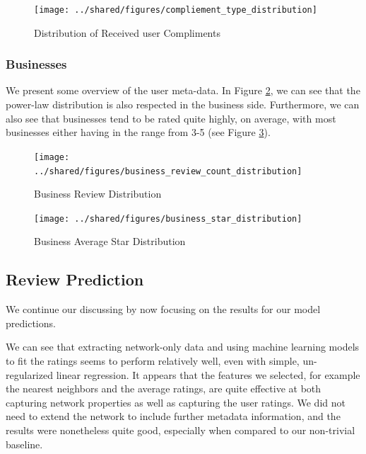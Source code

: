 \documentclass[letterpaper, 10 pt, conference]{ieeeconf}  %
\begin{document}
\begin{figure}[h!]
\centering
\texttt{[image: ../shared/figures/compliement\_type\_distribution]}
\caption{Distribution of Received user Compliments}
\label{fig:user_compliment_distribution}
\end{figure}

\subsubsection{Businesses}
We present some overview of the user meta-data. In Figure \ref{fig:business_review_distribution}, we can see that the power-law distribution is also respected in the business side. Furthermore, we can also see that businesses tend to be rated quite highly, on average, with most businesses either having in the range from 3-5 (see Figure \ref{fig:business_star_distribution}).

\begin{figure}[h!]
\centering
\texttt{[image: ../shared/figures/business\_review\_count\_distribution]}
\caption{Business Review Distribution}
\label{fig:business_review_distribution}
\end{figure}

\begin{figure}[h!]
\centering
\texttt{[image: ../shared/figures/business\_star\_distribution]}
\caption{Business Average Star Distribution}
\label{fig:business_star_distribution}
\end{figure}

\subsection{Review Prediction}
We continue our discussing by now focusing on the results for our model predictions.

We can see that extracting network-only data and using machine learning models to fit the ratings seems to perform relatively well, even with simple, un-regularized linear regression. It appears that the features we selected, for example the nearest neighbors and the average ratings, are quite effective at both capturing network properties as well as capturing the user ratings. We did not need to extend the network to include further metadata information, and the results were nonetheless quite good, especially when compared to our non-trivial baseline.
\end{document}
